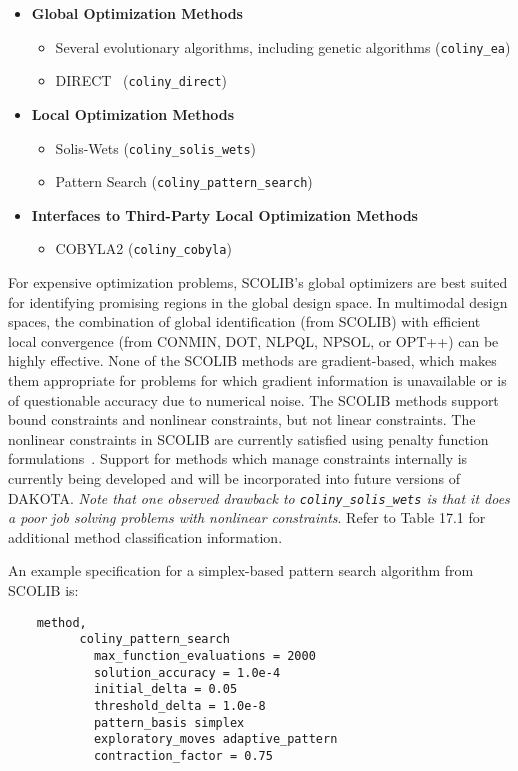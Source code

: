 \begin{itemize}

\item {\bf Global Optimization Methods}
\begin{itemize}
\item Several evolutionary algorithms, including genetic algorithms
      (\texttt{coliny\_ea})
\item DIRECT~\cite{Per93} (\texttt{coliny\_direct})
\end{itemize}

\item {\bf Local Optimization Methods}
\begin{itemize}
\item Solis-Wets (\texttt{coliny\_solis\_wets})
\item Pattern Search (\texttt{coliny\_pattern\_search})
\end{itemize}

\item {\bf Interfaces to Third-Party Local Optimization Methods}
\begin{itemize}
\item COBYLA2 (\texttt{coliny\_cobyla})
\end{itemize}

\end{itemize}

For expensive optimization problems, SCOLIB's global optimizers are
best suited for identifying promising regions in the global design
space. In multimodal design spaces, the combination of global
identification (from SCOLIB) with efficient local convergence (from
CONMIN, DOT, NLPQL, NPSOL, or OPT++) can be highly effective. None of
the SCOLIB methods are gradient-based, which makes them appropriate
for problems for which gradient information is unavailable or is of
questionable accuracy due to numerical noise. The SCOLIB methods
support bound constraints and nonlinear constraints, but not linear
constraints.  The nonlinear constraints in SCOLIB are currently
satisfied using penalty function formulations~\cite{Pon96}. Support
for methods which manage constraints internally is currently being
developed and will be incorporated into future versions of DAKOTA.
\emph{Note that one observed drawback to \texttt{coliny\_solis\_wets}
is that it does a poor job solving problems with nonlinear
constraints}.  Refer to Table 17.1 for additional method
classification information.

An example specification for a simplex-based pattern search algorithm
from SCOLIB is:
\begin{small}
\begin{verbatim}
    method,
          coliny_pattern_search
            max_function_evaluations = 2000
            solution_accuracy = 1.0e-4
            initial_delta = 0.05
            threshold_delta = 1.0e-8
            pattern_basis simplex
            exploratory_moves adaptive_pattern
            contraction_factor = 0.75
\end{verbatim}
\end{small}

